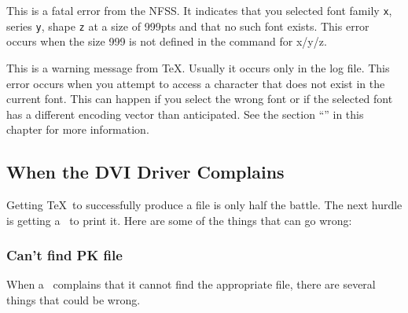 \begin{iplist}{.25in}

This is a fatal error from the NFSS.  It indicates
that you selected font family \texttt{x}, series \texttt{y}, shape \texttt{z}
at a size
of 999pts and that no such font exists.  This error occurs when
the size 999 is not defined in the  command
for x/y/z.  


This is a warning message from \TeX.  Usually it occurs only in the 
log file.  This error occurs when you attempt to access a character
that does not exist in the current font.
This can happen if you select the wrong font or if the selected font has a
different encoding vector than anticipated.  See the section
``'' in this chapter for more information.
\end{iplist}

\subsection{When the DVI Driver Complains}

Getting \TeX\ to successfully produce a  file is only half
the battle.  The next hurdle is getting a \dvidriver\ to print it.
Here are some of the things that can go wrong:

\subsubsection{Can't find PK file}

When a \dvidriver\ complains that it cannot find the appropriate 
file, there are several things that could be wrong.

